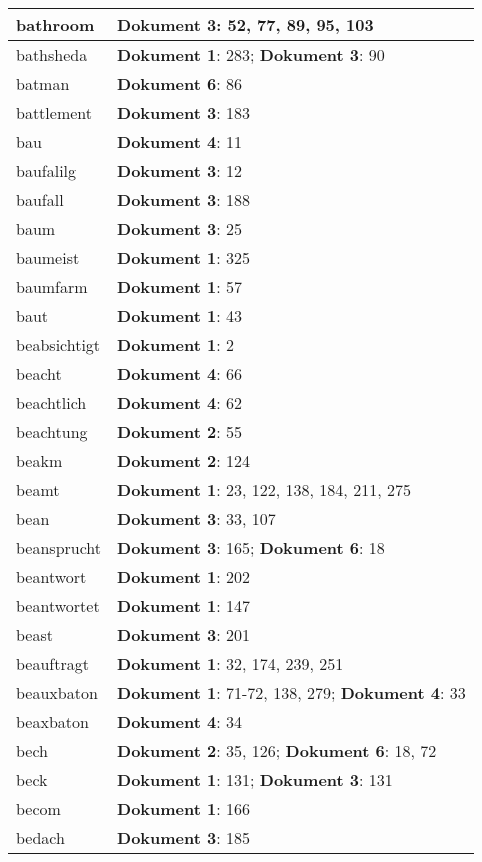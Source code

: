 \documentclass[a5paper]{article}
\begin{document}
\begin{longtable}[l]{|l|p{3in}|}
\hline
bathroom & \textbf{Dokument 3}: 52, 77, 89, 95, 103 \\
\hline
bathsheda & \textbf{Dokument 1}: 283; \textbf{Dokument 3}: 90 \\
\hline
batman & \textbf{Dokument 6}: 86 \\
\hline
battlement & \textbf{Dokument 3}: 183 \\
\hline
bau & \textbf{Dokument 4}: 11 \\
\hline
baufalilg & \textbf{Dokument 3}: 12 \\
\hline
baufall & \textbf{Dokument 3}: 188 \\
\hline
baum & \textbf{Dokument 3}: 25 \\
\hline
baumeist & \textbf{Dokument 1}: 325 \\
\hline
baumfarm & \textbf{Dokument 1}: 57 \\
\hline
baut & \textbf{Dokument 1}: 43 \\
\hline
beabsichtigt & \textbf{Dokument 1}: 2 \\
\hline
beacht & \textbf{Dokument 4}: 66 \\
\hline
beachtlich & \textbf{Dokument 4}: 62 \\
\hline
beachtung & \textbf{Dokument 2}: 55 \\
\hline
beakm & \textbf{Dokument 2}: 124 \\
\hline
beamt & \textbf{Dokument 1}: 23, 122, 138, 184, 211, 275 \\
\hline
bean & \textbf{Dokument 3}: 33, 107 \\
\hline
beansprucht & \textbf{Dokument 3}: 165; \textbf{Dokument 6}: 18 \\
\hline
beantwort & \textbf{Dokument 1}: 202 \\
\hline
beantwortet & \textbf{Dokument 1}: 147 \\
\hline
beast & \textbf{Dokument 3}: 201 \\
\hline
beauftragt & \textbf{Dokument 1}: 32, 174, 239, 251 \\
\hline
beauxbaton & \textbf{Dokument 1}: 71-72, 138, 279; \textbf{Dokument 4}: 33 \\
\hline
beaxbaton & \textbf{Dokument 4}: 34 \\
\hline
bech & \textbf{Dokument 2}: 35, 126; \textbf{Dokument 6}: 18, 72 \\
\hline
beck & \textbf{Dokument 1}: 131; \textbf{Dokument 3}: 131 \\
\hline
becom & \textbf{Dokument 1}: 166 \\
\hline
bedach & \textbf{Dokument 3}: 185 \\

\end{longtable}
\end{document}
